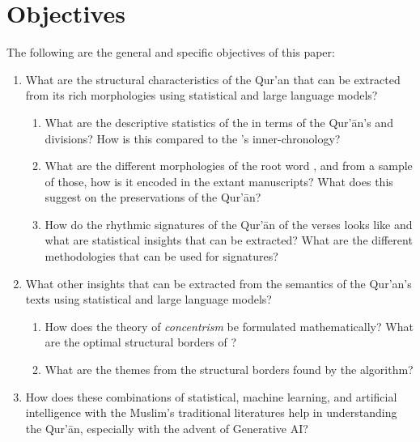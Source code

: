 \section{Objectives}\label{sec:objectives}
The following are the general and specific objectives of this paper:
\begin{enumerate}
    \item What are the structural characteristics of the Qur'an that can be extracted from its rich morphologies using statistical and large language models?
    \begin{enumerate}
        \item What are the descriptive statistics of the   in terms of the Qur'\=an's   and   divisions? How is this compared to the 's inner-chronology?
        
        \item What are the different morphologies of the root word  , and from a sample of those, how is it encoded in the extant manuscripts? What does this suggest on the preservations of the Qur'\=an?
        
        \item How do the rhythmic signatures of the Qur'\=an of the verses looks like and what are statistical insights that can be extracted? What are the different methodologies that can be used for signatures?

    \end{enumerate}
    
    \item What other insights that can be extracted from the semantics of the Qur'an's texts using statistical and large language models?
    \begin{enumerate}
        \item How does the theory of \textit{concentrism} be formulated mathematically? What are the optimal structural borders of  ?
        
        \item What are the themes from the structural borders found by the algorithm?
    \end{enumerate}
    
    \item How does these combinations of statistical, machine learning, and artificial intelligence with the Muslim's traditional literatures help in understanding the Qur'\=an, especially with the advent of Generative AI?
\end{enumerate}


